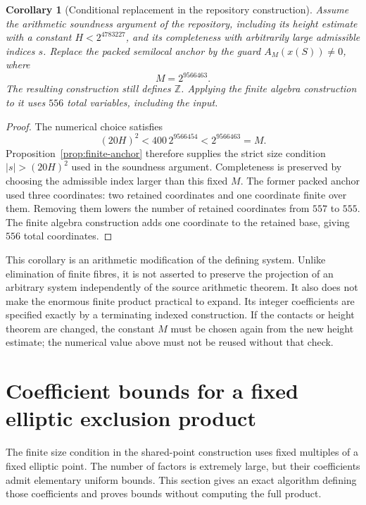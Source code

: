 \documentclass[11pt]{article}
\newtheorem{corollary}[theorem]{Corollary}
\theoremstyle{definition}
\begin{document}
\begin{corollary}[Conditional replacement in the repository construction]
\label{cor:556-anchor}
Assume the arithmetic soundness argument of the repository, including its
height estimate with a constant $H<2^{4783227}$, and its completeness with
arbitrarily large admissible indices $s$.  Replace the packed semilocal
anchor by the guard $A_M(x(S))\ne0$, where
\[
                    M=2^{9566463}.
\]
The resulting construction still defines $\mathbb Z$.  Applying the
finite algebra construction to it uses $556$ total variables, including the
input.
\end{corollary}
\begin{proof}
The numerical choice satisfies
\[
 (20H)^2<400\,2^{9566454}<2^{9566463}=M.
\]
Proposition~\ref{prop:finite-anchor} therefore supplies the strict size
condition $|s|>(20H)^2$ used in the soundness argument.  Completeness is
preserved by choosing the admissible index larger than this fixed $M$.
The former packed anchor used three coordinates: two retained coordinates
and one coordinate finite over them.  Removing them lowers the number of
retained coordinates from $557$ to $555$.  The finite algebra construction
adds one coordinate to the retained base, giving $556$ total coordinates.
\end{proof}

This corollary is an arithmetic modification of the defining system.
Unlike elimination of finite fibres, it is not asserted to preserve the
projection of an arbitrary system independently of the source arithmetic
theorem.  It also does not make the enormous finite product practical to
expand.  Its integer coefficients are specified exactly by a terminating
indexed construction.  If the contacts or height theorem are changed, the
constant $M$ must be chosen again from the new height estimate; the
numerical value above must not be reused without that check.



\section{Coefficient bounds for a fixed elliptic exclusion product}
\label{sec:fixed-anchor-height}

The finite size condition in the shared-point construction uses fixed
multiples of a fixed elliptic point.  The number of factors is extremely
large, but their coefficients admit elementary uniform bounds.  This
section gives an exact algorithm defining those coefficients and proves
bounds without computing the full product.
\end{document}
